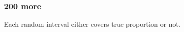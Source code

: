 \documentclass[handout]{beamer}
\begin{document}


   \begin{frame}
   \frametitle{200 more}
   \begin{center}
   \end{center}
   Each {\color{orange} random interval} either covers {\color{blue} true proportion} or not.
   \end{frame}


   \begin{frame} 

   \end{frame}

   
\end{document}
